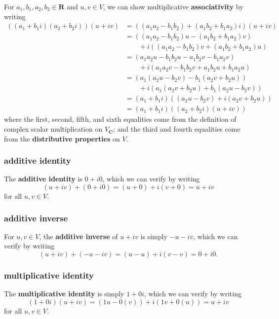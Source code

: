 \documentclass{article}
\begin{document}
For $a_1,b_1,a_2,b_2\in\mathbf{R}$ and $u,v\in V$, we can show multiplicative \textbf{associativity} by writing
\begin{align*}
    ((a_1+b_1i)(a_2+b_2i))(u+iv)&=((a_1a_2-b_1b_2)+(a_1b_2+b_1a_2)i)(u+iv)\\
    &=((a_1a_2-b_1b_2)u-(a_1b_2+b_1a_2)v)\\
    &\qquad+i((a_1a_2-b_1b_2)v+(a_1b_2+b_1a_2)u)\\
    &=(a_1a_2u-b_1b_2u-a_1b_2v-b_1a_2v)\\
    &\qquad+i(a_1a_2v-b_1b_2v+a_1b_2u+b_1a_2u)\\
    &=(a_1(a_2u-b_2v)-b_1(a_2v+b_2u))\\
    &\qquad+i(a_1(a_2v+b_2u)+b_1(a_2u-b_2v))\\
    &=(a_1+b_1i)((a_2u-b_2v)+i(a_2v+b_2u))\\
    &=(a_1+b_1i)((a_2+b_2i)(u+iv))
\end{align*}
where the first, second, fifth, and sixth equalities come from the definition of complex scalar multiplication on $V_{\mathbf{C}}$; and the third and fourth equalities come from the \textbf{distributive properties} on $V$.

\subsubsection*{additive identity}
The \textbf{additive identity} is $0+i0$, which we can verify by writing
\[(u+iv)+(0+i0)=(u+0)+i(v+0)=u+iv\]
for all $u,v\in V$.

\subsubsection*{additive inverse}
For $u,v\in V$, the \textbf{additive inverse} of $u+iv$ is simply $-u-iv$, which we can verify by writing
\[(u+iv)+(-u-iv)=(u-u)+i(v-v)=0+i0.\]

\subsubsection*{multiplicative identity}
The \textbf{multiplicative identity} is simply $1+0i$, which we can verify by writing
\[(1+0i)(u+iv)=(1u-0(v))+i(1v+0(u))=u+iv\]
for all $u,v\in V$.
\end{document}
